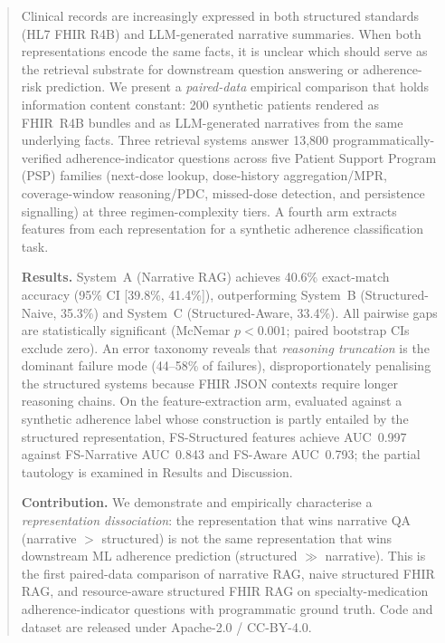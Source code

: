 \begin{abstract}
Clinical records are increasingly expressed in both structured standards (HL7 FHIR R4B) and
LLM-generated narrative summaries. When both representations encode the same facts, it is
unclear which should serve as the retrieval substrate for downstream question answering or
adherence-risk prediction.  We present a \emph{paired-data} empirical comparison that holds
information content constant: 200 synthetic patients rendered as FHIR~R4B bundles and as
LLM-generated narratives from the same underlying facts.  Three retrieval systems answer
13,800 programmatically-verified adherence-indicator questions across five Patient Support
Program (PSP) families (next-dose lookup, dose-history aggregation/MPR, coverage-window
reasoning/PDC, missed-dose detection, and persistence signalling) at three regimen-complexity
tiers.  A fourth arm extracts features from each representation for a synthetic adherence
classification task.

\textbf{Results.}  System~A (Narrative RAG) achieves 40.6\% exact-match accuracy
(95\% CI [39.8\%, 41.4\%]), outperforming System~B (Structured-Naive, 35.3\%) and
System~C (Structured-Aware, 33.4\%).  All pairwise gaps are statistically significant
(McNemar $p<0.001$; paired bootstrap CIs exclude zero).  An error taxonomy reveals
that \textit{reasoning truncation} is the dominant failure mode (44--58\% of failures),
disproportionately penalising the structured systems because FHIR JSON contexts require
longer reasoning chains.  On the feature-extraction arm, evaluated against a synthetic
adherence label whose construction is partly entailed by the structured representation,
FS-Structured features achieve AUC~0.997 against FS-Narrative AUC~0.843 and FS-Aware
AUC~0.793; the partial tautology is examined in Results and Discussion.

\textbf{Contribution.}  We demonstrate and empirically characterise a \textit{representation
dissociation}: the representation that wins narrative QA (narrative $>$ structured) is not
the same representation that wins downstream ML adherence prediction (structured $\gg$
narrative).  This is the first paired-data comparison of narrative RAG, naive structured FHIR
RAG, and resource-aware structured FHIR RAG on specialty-medication adherence-indicator
questions with programmatic ground truth.  Code and dataset are released under Apache-2.0 /
CC-BY-4.0.
\end{abstract}
